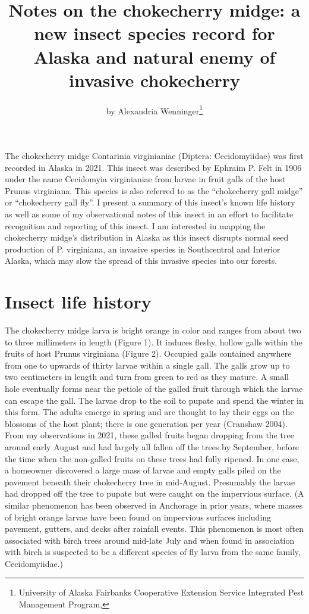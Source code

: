 \title{Notes on the chokecherry midge: a new insect species record for Alaska and natural enemy of invasive chokecherry}

\author{by Alexandria Wenninger\footnote{University of Alaska Fairbanks Cooperative Extension Service Integrated Pest Management Program, }}

\maketitle

The chokecherry midge Contarinia virginianiae (Diptera: Cecidomyiidae) was first recorded in Alaska in 2021. This insect was described by Ephraim P. Felt in 1906 under the name Cecidomyia virginianiae from larvae in fruit galls of the host Prunus virginiana. This species is also referred to as the ``chokecherry gall midge'' or ``chokecherry gall fly''. I present a summary of this insect’s known life history as well as some of my observational notes of this insect in an effort to facilitate recognition and reporting of this insect. I am interested in mapping the chokecherry midge’s distribution in Alaska as this insect disrupts normal seed production of P. virginiana, an invasive species in Southcentral and Interior Alaska, which may slow the spread of this invasive species into our forests. 

\section{Insect life history}

The chokecherry midge larva is bright orange in color and ranges from about two to three millimeters in length (Figure 1). It induces fleshy, hollow galls within the fruits of host Prunus virginiana (Figure 2). Occupied galls contained anywhere from one to upwards of thirty larvae within a single gall. The galls grow up to two centimeters in length and turn from green to red as they mature. A small hole eventually forms near the petiole of the galled fruit through which the larvae can escape the gall. The larvae drop to the soil to pupate and spend the winter in this form. The adults emerge in spring and are thought to lay their eggs on the blossoms of the host plant; there is one generation per year (Cranshaw 2004). 
From my observations in 2021, these galled fruits began dropping from the tree around early August and had largely all fallen off the trees by September, before the time when the non-galled fruits on these trees had fully ripened. In one case, a homeowner discovered a large mass of larvae and empty galls piled on the pavement beneath their chokecherry tree in mid-August. Presumably the larvae had dropped off the tree to pupate but were caught on the impervious surface. (A similar phenomenon has been observed in Anchorage in prior years, where masses of bright orange larvae have been found on impervious surfaces including pavement, gutters, and decks after rainfall events. This phenomenon is most often associated with birch trees around mid-late July and when found in association with birch is suspected to be a different species of fly larva from the same family, Cecidomyiidae.)

